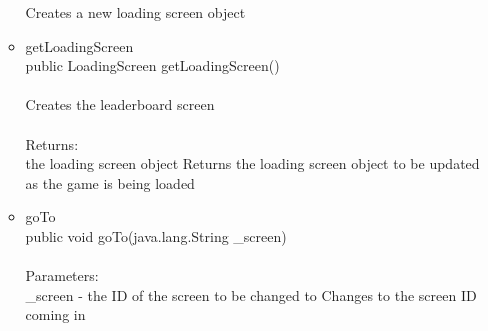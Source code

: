 \documentclass[letterpaper]{article}
\begin{document}
\begin{itemize}
\begin{itemize}
															Creates a new loading screen object
													\item	getLoadingScreen \\
															public LoadingScreen getLoadingScreen() \\ \\
															Creates the leaderboard screen \\ \\
															Returns: \\
															the loading screen object Returns the loading screen object to be updated as the game is being loaded
													\item	goTo \\
															public void goTo(java.lang.String \_screen) \\ \\
															Parameters: \\ 
															\_screen - the ID of the screen to be changed to Changes to the screen ID coming in
												\end{itemize}
									\end{itemize}
									
\end{document}
